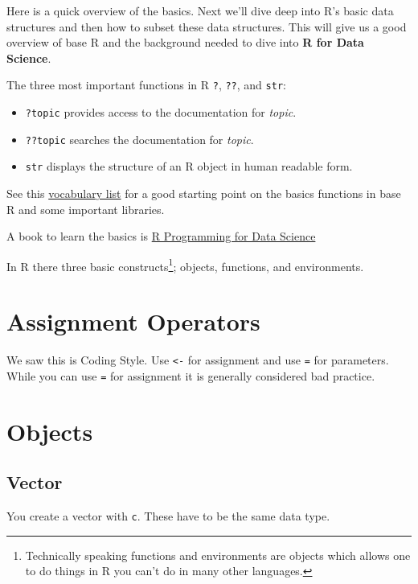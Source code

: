 \documentclass[]{book}
\providecommand{\tightlist}{%
  \setlength{\itemsep}{0pt}\setlength{\parskip}{0pt}}
\let\rmarkdownfootnote\footnote%
\def\footnote{\protect\rmarkdownfootnote}
\theoremstyle{definition}
\theoremstyle{definition}
\theoremstyle{definition}
\theoremstyle{remark}
\begin{document}
Here is a quick overview of the basics. Next we'll dive deep into R's
basic data structures and then how to subset these data structures. This
will give us a good overview of base R and the background needed to dive
into \textbf{R for Data Science}.

The three most important functions in R \texttt{?}, \texttt{??}, and
\texttt{str}:

\begin{itemize}
\tightlist
\item
  \texttt{?topic} provides access to the documentation for \emph{topic}.
\item
  \texttt{??topic} searches the documentation for \emph{topic}.
\item
  \texttt{str} displays the structure of an R object in human readable
  form.
\end{itemize}

See this \href{http://adv-r.had.co.nz/Vocabulary.html}{vocabulary list}
for a good starting point on the basics functions in base R and some
important libraries.

A book to learn the basics is
\href{https://bookdown.org/rdpeng/rprogdatascience/}{R Programming for
Data Science}

In R there three basic constructs\footnote{Technically speaking
  functions and environments are objects which allows one to do things
  in R you can't do in many other languages.}; objects, functions, and
environments.

\hypertarget{assignment-operators}{%
\section{Assignment Operators}\label{assignment-operators}}

We saw this is Coding Style. Use \texttt{\textless{}-} for assignment
and use \texttt{=} for parameters. While you can use \texttt{=} for
assignment it is generally considered bad practice.

\hypertarget{objects}{%
\section{Objects}\label{objects}}

\hypertarget{vector}{%
\subsection{Vector}\label{vector}}

You create a vector with \texttt{c}. These have to be the same data
type.
\end{document}
